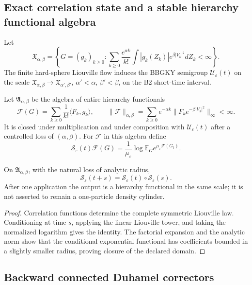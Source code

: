 \subsection{Exact correlation state and a stable hierarchy functional algebra}

Let
\[
 \mathfrak X_{\alpha,\beta}
 =\left\{G=(g_k)_{k\ge0}:
 \sum_{k\ge0}\frac{e^{\alpha k}}{k!}
 \int|g_k(Z_k)|e^{\beta|V_k|^2}dZ_k<\infty\right\}.
\]
The finite hard-sphere Liouville flow induces the BBGKY semigroup
\(\mathscr U_\varepsilon(t)\) on the scale
\(\mathfrak X_{\alpha,\beta}\to\mathfrak X_{\alpha',\beta'}\),
\(\alpha'<\alpha\), \(\beta'<\beta\), on the B2 short-time interval.

Let \(\mathfrak A_{\alpha,\beta}\) be the algebra of entire hierarchy
functionals
\[
 \mathcal F(G)=
 \sum_{k\ge0}\frac1{k!}\langle F_k,g_k\rangle,
 \qquad
 \|\mathcal F\|_{\alpha,\beta}
 =\sum_{k\ge0}e^{-\alpha k}
 \|F_ke^{-\beta|V_k|^2}\|_\infty<\infty.
\]
It is closed under multiplication and under composition with
\(\mathscr U_\varepsilon(t)\) after a controlled loss of \((\alpha,\beta)\).
For \(\mathcal F\) in this algebra define
\[
 \mathscr S_\varepsilon(t)\mathcal F(G)
 =\frac1{\mu_\varepsilon}
 \log\mathbb E_G
 e^{\mu_\varepsilon\mathcal F(G_t)}.
\]

\begin{proposition}
\label{prop:r3-b4-hierarchy}
On \(\mathfrak A_{\alpha,\beta}\), with the natural loss of analytic radius,
\[
 \mathscr S_\varepsilon(t+s)
 =\mathscr S_\varepsilon(t)\circ
 \mathscr S_\varepsilon(s).
\]
After one application the output is a hierarchy functional in the same scale;
it is not asserted to remain a one-particle density cylinder.
\end{proposition}

\begin{proof}
Correlation functions determine the complete symmetric Liouville law.
Conditioning at time \(s\), applying the linear Liouville tower, and taking the
normalized logarithm gives the identity.  The factorial expansion and the
analytic norm show that the conditional exponential functional has coefficients
bounded in a slightly smaller radius, proving closure of the declared domain.
\end{proof}

\subsection{Backward connected Duhamel correctors}

